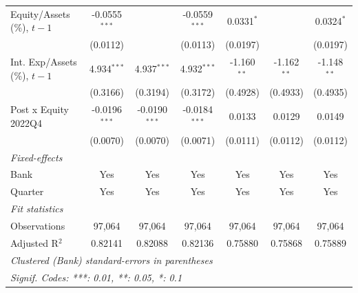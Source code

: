 \begin{tabular}{lcccccc}
   Equity/Assets (\%), $t{-}1$      & -0.0555$^{***}$ &                 & -0.0559$^{***}$ & 0.0331$^{*}$    &                 & 0.0324$^{*}$\\   
                                    & (0.0112)        &                 & (0.0113)        & (0.0197)        &                 & (0.0197)\\   
   Int. Exp/Assets (\%), $t{-}1$    & 4.934$^{***}$   & 4.937$^{***}$   & 4.932$^{***}$   & -1.160$^{**}$   & -1.162$^{**}$   & -1.148$^{**}$\\   
                                    & (0.3166)        & (0.3194)        & (0.3172)        & (0.4928)        & (0.4933)        & (0.4935)\\   
   Post x Equity 2022Q4             & -0.0196$^{***}$ & -0.0190$^{***}$ & -0.0184$^{***}$ & 0.0133          & 0.0129          & 0.0149\\   
                                    & (0.0070)        & (0.0070)        & (0.0071)        & (0.0111)        & (0.0112)        & (0.0112)\\   
   \midrule
   \emph{Fixed-effects}\\
   Bank                             & Yes             & Yes             & Yes             & Yes             & Yes             & Yes\\  
   Quarter                          & Yes             & Yes             & Yes             & Yes             & Yes             & Yes\\  
   \midrule
   \emph{Fit statistics}\\
   Observations                     & 97,064          & 97,064          & 97,064          & 97,064          & 97,064          & 97,064\\  
   Adjusted R$^2$                   & 0.82141         & 0.82088         & 0.82136         & 0.75880         & 0.75868         & 0.75889\\  
   \midrule \midrule
   \multicolumn{7}{l}{\emph{Clustered (Bank) standard-errors in parentheses}}\\
   \multicolumn{7}{l}{\emph{Signif. Codes: ***: 0.01, **: 0.05, *: 0.1}}\\
\end{tabular}
\par\endgroup


